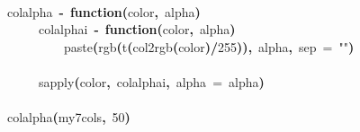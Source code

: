 \documentclass[a4paper]{article}
\newcommand{\hlnumber}[1]{\textcolor[rgb]{0.0823529411764706,0.0784313725490196,0.709803921568627}{#1}}%
\newcommand{\hlfunctioncall}[1]{\textcolor[rgb]{1,0,0}{#1}}%
\newcommand{\hlstring}[1]{\textcolor[rgb]{0.6,0.6,1}{#1}}%
\newcommand{\hlkeyword}[1]{\textcolor[rgb]{0,0,0}{\textbf{#1}}}%
\newcommand{\hlargument}[1]{\textcolor[rgb]{0.694117647058824,0.247058823529412,0.0196078431372549}{#1}}%
\newcommand{\hlformalargs}[1]{\textcolor[rgb]{0.0705882352941176,0.713725490196078,0.0705882352941176}{#1}}%
\newcommand{\hlassignement}[1]{\textcolor[rgb]{0.215686274509804,0.215686274509804,0.384313725490196}{\textbf{#1}}}%
\newcommand{\hlsymbol}[1]{\textcolor[rgb]{0,0,0}{#1}}%
\newcommand{\hlprompt}[1]{\textcolor[rgb]{0,0,0}{#1}}%
\newcommand{\hlstd}[1]{\textcolor[rgb]{0,0,0}{#1}}%
\newenvironment{Houtput}{\raggedright}{%
%
}
\renewenvironment{Schunk}{\vspace{\topsep}}{\vspace{\topsep}}
\begin{document}
\begin{Houtput}
\hspace*{\fill}\\
\hlstd{}\ttfamily\noindent
\hlprompt{\usebox{\hlnormalsizeboxgreaterthan}{\ }}\hlsymbol{colalpha}{\ }\hlassignement{\usebox{\hlnormalsizeboxlessthan}-}{\ }\hlkeyword{function}\hlkeyword{(}\hlformalargs{color}\hlkeyword{,}{\ }\hlformalargs{alpha}\hlkeyword{)}{\ }\hlkeyword{\usebox{\hlnormalsizeboxopenbrace}}\hspace*{\fill}\\
\hlstd{}\hlprompt{{\ }}{\ }{\ }{\ }{\ }\hlsymbol{colalphai}{\ }\hlassignement{\usebox{\hlnormalsizeboxlessthan}-}{\ }\hlkeyword{function}\hlkeyword{(}\hlformalargs{color}\hlkeyword{,}{\ }\hlformalargs{alpha}\hlkeyword{)}{\ }\hlkeyword{\usebox{\hlnormalsizeboxopenbrace}}\hspace*{\fill}\\
\hlstd{}\hlprompt{{\ }}{\ }{\ }{\ }{\ }{\ }{\ }{\ }{\ }\hlfunctioncall{paste}\hlkeyword{(}\hlfunctioncall{rgb}\hlkeyword{(}\hlfunctioncall{t}\hlkeyword{(}\hlfunctioncall{col2rgb}\hlkeyword{(}\hlsymbol{color}\hlkeyword{)}\hlkeyword{/}\hlnumber{255}\hlkeyword{)}\hlkeyword{)}\hlkeyword{,}{\ }\hlsymbol{alpha}\hlkeyword{,}{\ }\hlargument{sep}{\ }\hlargument{=}{\ }\hlstring{""}\hlkeyword{)}\hspace*{\fill}\\
\hlstd{}\hlprompt{{\ }}{\ }{\ }{\ }{\ }\hlkeyword{\usebox{\hlnormalsizeboxclosebrace}}\hspace*{\fill}\\
\hlstd{}\hlprompt{{\ }}{\ }{\ }{\ }{\ }\hlfunctioncall{sapply}\hlkeyword{(}\hlsymbol{color}\hlkeyword{,}{\ }\hlsymbol{colalphai}\hlkeyword{,}{\ }\hlargument{alpha}{\ }\hlargument{=}{\ }\hlsymbol{alpha}\hlkeyword{)}\hspace*{\fill}\\
\hlstd{}\hlprompt{{\ }}\hlkeyword{\usebox{\hlnormalsizeboxclosebrace}}\mbox{}
\normalfont
\hspace*{\fill}\\
\hlstd{}\ttfamily\noindent
\hlprompt{\usebox{\hlnormalsizeboxgreaterthan}{\ }}\hlfunctioncall{colalpha}\hlkeyword{(}\hlsymbol{my7cols}\hlkeyword{,}{\ }\hlnumber{50}\hlkeyword{)}\mbox{}
\normalfont
\hspace*{\fill}\\
\hlstd{}\begin{Schunk}

\end{Schunk}
\end{Houtput}
\end{document}
